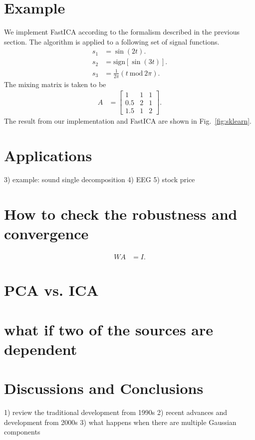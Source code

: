 \documentclass[aps,prl,preprint,superscriptaddress]{revtex4-2}
\begin{document}
\section{Example}
We implement FastICA according to the formalism described in the previous section.
The algorithm is applied to a following set of signal functions.
\begin{align}
s_1 &= \sin(2 t). \\
s_2 &= \mathrm{sign} [\sin(3 t)]. \\
s_3 &= \frac{1}{2\pi} (t~\mathrm{mod}~2\pi).
\end{align}
The mixing matrix is taken to be
\begin{align}
A &= \begin{bmatrix}
1 & 1 & 1 \\
0.5 & 2 & 1 \\
1.5 & 1 & 2
\end{bmatrix}.
\end{align}
The result from our implementation and FastICA are shown in Fig.~\ref{fig:sklearn}.

\section{Applications}
3) example: sound single decomposition
4) EEG %
5) stock price


\section{How to check the robustness and convergence}

\begin{align}
W A &= I.
\end{align}



\section{PCA vs. ICA}

\section{what if two of the sources are dependent}

\section{Discussions and Conclusions}
1) review the traditional development from 1990s
2) recent advances and development from 2000s  
3) what happens when there are multiple Gaussian components
\end{document}
